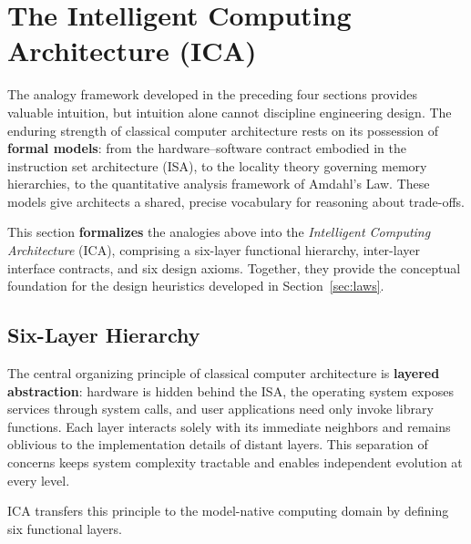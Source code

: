 \section{The Intelligent Computing Architecture (ICA)}
\label{sec:icam}

The analogy framework developed in the preceding four sections provides valuable intuition, but intuition alone cannot discipline engineering design. The enduring strength of classical computer architecture rests on its possession of \textbf{formal models}: from the hardware--software contract embodied in the instruction set architecture (ISA), to the locality theory governing memory hierarchies, to the quantitative analysis framework of Amdahl's Law. These models give architects a shared, precise vocabulary for reasoning about trade-offs.

This section \textbf{formalizes} the analogies above into the \textit{Intelligent Computing Architecture} (ICA), comprising a six-layer functional hierarchy, inter-layer interface contracts, and six design axioms. Together, they provide the conceptual foundation for the design heuristics developed in Section~\ref{sec:laws}.

\subsection{Six-Layer Hierarchy}
\label{sec:icam-layers}

The central organizing principle of classical computer architecture is \textbf{layered abstraction}: hardware is hidden behind the ISA, the operating system exposes services through system calls, and user applications need only invoke library functions. Each layer interacts solely with its immediate neighbors and remains oblivious to the implementation details of distant layers. This separation of concerns keeps system complexity tractable and enables independent evolution at every level.

ICA transfers this principle to the model-native computing domain by defining six functional layers.

